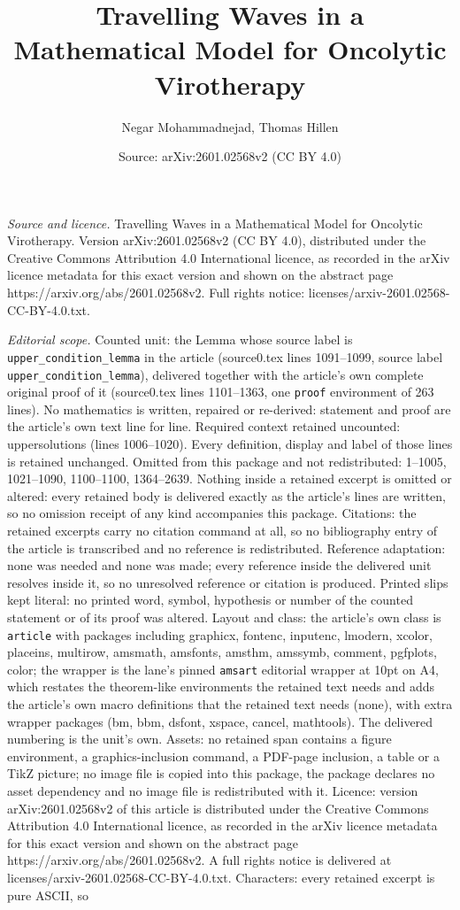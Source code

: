 \documentclass[10pt,a4paper]{amsart}
\title[Travelling Waves in a Mathematical Model for Oncolytic Virot]{Travelling Waves in a Mathematical Model for Oncolytic Virotherapy}
\author{Negar Mohammadnejad, Thomas Hillen}
\date{Source: arXiv:2601.02568v2 (CC BY 4.0)}
\begin{document}
\maketitle

\noindent\emph{Source and licence.} Travelling Waves in a Mathematical Model for Oncolytic Virotherapy. Version arXiv:2601.02568v2 (CC BY 4.0), distributed under the Creative Commons Attribution 4.0 International licence, as recorded in the arXiv licence metadata for this exact version and shown on the abstract page https://arxiv.org/abs/2601.02568v2. Full rights notice: licenses/arxiv-2601.02568-CC-BY-4.0.txt.\par\smallskip

\noindent\textit{Editorial scope.} Counted unit: the Lemma whose source label is \texttt{upper\_condition\_lemma} in the article (source0.tex lines 1091--1099, source label \texttt{upper\_condition\_lemma}), delivered together with the article's own complete original proof of it (source0.tex lines 1101--1363, one \texttt{proof} environment of 263 lines). No mathematics is written, repaired or re-derived: statement and proof are the article's own text line for line. Required context retained uncounted: uppersolutions (lines 1006--1020). Every definition, display and label of those lines is retained unchanged. Omitted from this package and not redistributed: 1--1005, 1021--1090, 1100--1100, 1364--2639. Nothing inside a retained excerpt is omitted or altered: every retained body is delivered exactly as the article's lines are written, so no omission receipt of any kind accompanies this package. Citations: the retained excerpts carry no citation command at all, so no bibliography entry of the article is transcribed and no reference is redistributed. Reference adaptation: none was needed and none was made; every reference inside the delivered unit resolves inside it, so no unresolved reference or citation is produced. Printed slips kept literal: no printed word, symbol, hypothesis or number of the counted statement or of its proof was altered. Layout and class: the article's own class is \texttt{article} with packages including graphicx, fontenc, inputenc, lmodern, xcolor, placeins, multirow, amsmath, amsfonts, amsthm, amssymb, comment, pgfplots, color; the wrapper is the lane's pinned \texttt{amsart} editorial wrapper at 10pt on A4, which restates the theorem-like environments the retained text needs and adds the article's own macro definitions that the retained text needs (none), with extra wrapper packages (bm, bbm, dsfont, xspace, cancel, mathtools). The delivered numbering is the unit's own. Assets: no retained span contains a figure environment, a graphics-inclusion command, a PDF-page inclusion, a table or a TikZ picture; no image file is copied into this package, the package declares no asset dependency and no image file is redistributed with it. Licence: version arXiv:2601.02568v2 of this article is distributed under the Creative Commons Attribution 4.0 International licence, as recorded in the arXiv licence metadata for this exact version and shown on the abstract page https://arxiv.org/abs/2601.02568v2. A full rights notice is delivered at licenses/arxiv-2601.02568-CC-BY-4.0.txt. Characters: every retained excerpt is pure ASCII, so 
\end{document}
